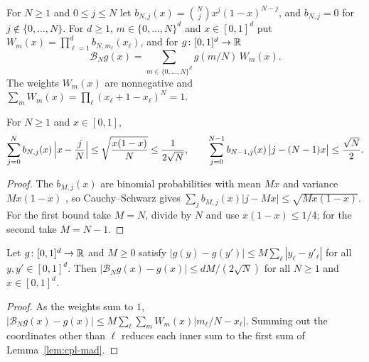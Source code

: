 \begin{definition}\label{def:cpl-bernstein}
For $N\ge1$ and $0\le j\le N$ let $b_{N,j}(x)=\binom Njx^j(1-x)^{N-j}$, and $b_{N,j}=0$ for $j\notin\{0,\dots,N\}$. For
$d\ge1$, $m\in\{0,\dots,N\}^d$ and $x\in[0,1]^d$ put $W_m(x)=\prod_{\ell=1}^db_{N,m_\ell}(x_\ell)$, and for
$g\colon[0,1]^d\to\mathbb{R}$
\[
 \mathcal B_Ng(x)=\sum_{m\in\{0,\dots,N\}^d}g(m/N)\,W_m(x).
\]
The weights $W_m(x)$ are nonnegative and $\sum_mW_m(x)=\prod_\ell(x_\ell+1-x_\ell)^N=1$.
\end{definition}

\begin{lemma}\label{lem:cpl-mad}
For $N\ge1$ and $x\in[0,1]$,
\[
 \sum_{j=0}^Nb_{N,j}(x)\,\Bigl|x-\frac jN\Bigr|\le\sqrt{\frac{x(1-x)}N}\le\frac1{2\sqrt N},
 \qquad
 \sum_{j=0}^{N-1}b_{N-1,j}(x)\,\bigl|j-(N-1)x\bigr|\le\frac{\sqrt N}2 .
\]
\end{lemma}

\begin{proof}
The $b_{M,j}(x)$ are binomial probabilities with mean $Mx$ and variance $Mx(1-x)$ \cite[\S1.1]{Lorentz1986}, so Cauchy--Schwarz gives $\sum_jb_{M,j}(x)|j-Mx|\le\sqrt{Mx(1-x)}$. For the first bound take $M=N$, divide by $N$ and use $x(1-x)\le1/4$; for the second take $M=N-1$.
\end{proof}

\begin{lemma}\label{lem:cpl-bernstein-value}
Let $g\colon[0,1]^d\to\mathbb{R}$ and $M\ge0$ satisfy $|g(y)-g(y')|\le M\sum_{\ell}|y_\ell-y'_\ell|$ for all
$y,y'\in[0,1]^d$. Then $|\mathcal B_Ng(x)-g(x)|\le dM/(2\sqrt N)$ for all $N\ge1$ and $x\in[0,1]^d$.
\end{lemma}

\begin{proof}
As the weights sum to $1$, $|\mathcal B_Ng(x)-g(x)|\le M\sum_\ell\sum_mW_m(x)|m_\ell/N-x_\ell|$. Summing out the coordinates other than $\ell$ reduces each inner sum to the first sum of Lemma~\ref{lem:cpl-mad}.
\end{proof}


